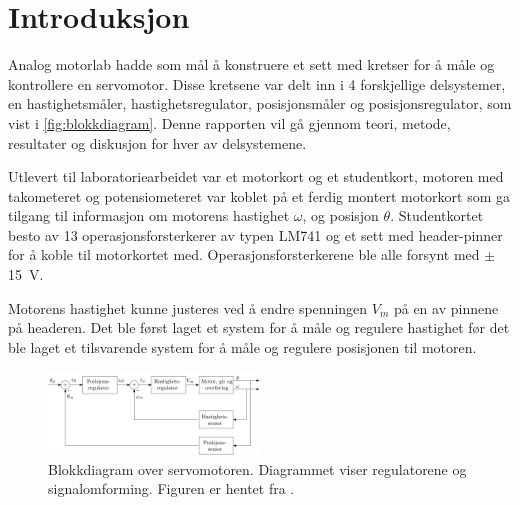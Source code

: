 \section{Introduksjon}\label{sec:intro}

Analog motorlab hadde som mål å konstruere et sett med kretser for å måle og kontrollere en servomotor. Disse kretsene var delt inn i 4 forskjellige delsystemer, en hastighetsmåler, hastighetsregulator, posisjonsmåler og posisjonsregulator, som vist i \autoref{fig:blokkdiagram}. Denne rapporten vil gå gjennom teori, metode, resultater og diskusjon for hver av delsystemene.

Utlevert til laboratoriearbeidet var et motorkort og et studentkort, motoren med takometeret og potensiometeret var koblet på et ferdig montert motorkort som ga tilgang til informasjon om motorens hastighet $\omega$, og posisjon $\theta$. Studentkortet besto av 13 operasjonsforsterkerer av typen LM741\cite{LM741} og et sett med header-pinner for å koble til motorkortet med. Operasjonsforsterkerene ble alle forsynt med $\pm${\SI{15}{\volt}}. 

Motorens hastighet kunne justeres ved å endre spenningen $V_m$ på en av pinnene på headeren. Det ble først laget et system for å måle og regulere hastighet før det ble laget et tilsvarende system for å måle og regulere posisjonen til motoren.

\begin{figure}[bh]
    \centering
    \includegraphics[width = 0.5\textwidth]{figurer/Blokkdiagram.png}
    \caption{Blokkdiagram over servomotoren. Diagrammet viser regulatorene og signalomforming. Figuren er hentet fra \cite{AnalogMotorlabbOppgaver}.}
    \label{fig:blokkdiagram}
\end{figure}
